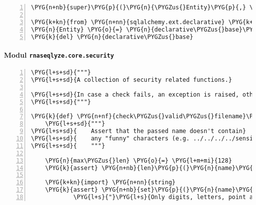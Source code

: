 \begin{Verbatim}[commandchars=\\\{\},numbers=left,firstnumber=1,stepnumber=5]
        \PYG{n+nb}{super}\PYG{p}{(}\PYG{n}{\PYGZus{}Entity}\PYG{p}{,} \PYG{n+nb+bp}{self}\PYG{p}{)}\PYG{o}{.}\PYG{n}{\PYGZus{}\PYGZus{}setattr\PYGZus{}\PYGZus{}}\PYG{p}{(}\PYG{n}{name}\PYG{p}{,} \PYG{n}{value}\PYG{p}{)}

\PYG{k+kn}{from} \PYG{n+nn}{sqlalchemy.ext.declarative} \PYG{k+kn}{import} \PYG{n}{declarative\PYGZus{}base}
\PYG{n}{Entity} \PYG{o}{=} \PYG{n}{declarative\PYGZus{}base}\PYG{p}{(}\PYG{n}{cls}\PYG{o}{=}\PYG{n}{\PYGZus{}Entity}\PYG{p}{)}
\PYG{k}{del} \PYG{n}{declarative\PYGZus{}base}
\end{Verbatim}


\paragraph{Modul \texttt{rnaseqlyze.core.security}}
\label{rnaseqlyze-pdf:modul-rnaseqlyze-core-security}
\begin{Verbatim}[commandchars=\\\{\},numbers=left,firstnumber=1,stepnumber=5]
\PYG{l+s+sd}{"""}
\PYG{l+s+sd}{A collection of security related functions.}

\PYG{l+s+sd}{In case a check fails, an exception is raised, otherwise None is returned.}
\PYG{l+s+sd}{"""}

\PYG{k}{def} \PYG{n+nf}{check\PYGZus{}valid\PYGZus{}filename}\PYG{p}{(}\PYG{n}{name}\PYG{p}{)}\PYG{p}{:}
    \PYG{l+s+sd}{"""}
\PYG{l+s+sd}{    Assert that the passed name doesn't contain}
\PYG{l+s+sd}{    any "funny" characters (e.g. ../../../../sensitive.txt)}
\PYG{l+s+sd}{    """}

    \PYG{n}{max\PYGZus{}len} \PYG{o}{=} \PYG{l+m+mi}{128}
    \PYG{k}{assert} \PYG{n+nb}{len}\PYG{p}{(}\PYG{n}{name}\PYG{p}{)} \PYG{o}{\textless{}} \PYG{n}{max\PYGZus{}len}\PYG{p}{,} \PYG{l+s}{"}\PYG{l+s}{Filename too long}\PYG{l+s}{"}

    \PYG{k+kn}{import} \PYG{n+nn}{string}
    \PYG{k}{assert} \PYG{n+nb}{set}\PYG{p}{(}\PYG{n}{name}\PYG{p}{)} \PYG{o}{\textless{}} \PYG{n+nb}{set}\PYG{p}{(}\PYG{n}{string}\PYG{o}{.}\PYG{n}{digits} \PYG{o}{+} \PYG{n}{string}\PYG{o}{.}\PYG{n}{letters} \PYG{o}{+} \PYG{l+s}{'}\PYG{l+s}{.\PYGZus{}}\PYG{l+s}{'}\PYG{p}{)}\PYG{p}{,} \PYGZbs{}
            \PYG{l+s}{"}\PYG{l+s}{Only digits, letters, point and underscore allowed in filenames}\PYG{l+s}{"}
\end{Verbatim}


